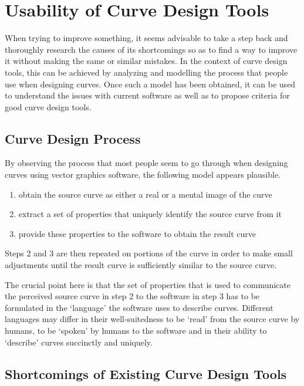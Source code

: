 \documentclass[a4paper]{article}
\begin{document}

	\section{Usability of Curve Design Tools}

		When trying to improve something, it seems advisable to take a step back and thoroughly research the causes of its shortcomings so as to find a way to improve it without making the same or similar mistakes. In the context of curve design tools, this can be achieved by analyzing and modelling the process that people use when designing curves. Once such a model has been obtained, it can be used to understand the issues with current software as well as to propose criteria for good curve design tools.

		\subsection{Curve Design Process}

			By observing the process that most people seem to go through when designing curves using vector graphics software, the following model appears plausible.

			\begin{enumerate}
				\item obtain the source curve as either a real or a mental image of the curve
				\item extract a set of properties that uniquely identify the source curve from it
				\item provide these properties to the software to obtain the result curve
			\end{enumerate}

			Steps 2 and 3 are then repeated on portions of the curve in order to make small adjustments until the result curve is sufficiently similar to the source curve.

			The crucial point here is that the set of properties that is used to communicate the perceived source curve in step 2 to the software in step 3 has to be formulated in the `language' the software uses to describe curves. Different languages may differ in their well-suitedness to be `read' from the source curve by humans, to be `spoken' by humans to the software and in their ability to `describe' curves succinctly and uniquely.

		\subsection{Shortcomings of Existing Curve Design Tools}
\end{document}
